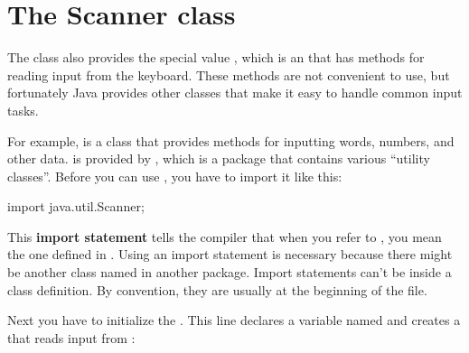 \section{The Scanner class}
\label{scanner}


%


The  class also provides the special value , which is an  that has methods for reading input from the keyboard.
These methods are not convenient to use, but fortunately Java provides other classes that make it easy to handle common input tasks.


For example,  is a class that provides methods for inputting words, numbers, and other data.
 is provided by , which is a package that contains various ``utility classes''.
Before you can use , you have to import it like this:

\begin{code}
import java.util.Scanner;
\end{code}


This {\bf import statement} tells the compiler that when you refer to , you mean the one defined in .
Using an import statement is necessary because there might be another class named  in another package.
Import statements can't be inside a class definition.
By convention, they are usually at the beginning of the file.

Next you have to initialize the .
This line declares a  variable named  and creates a  that reads input from :


